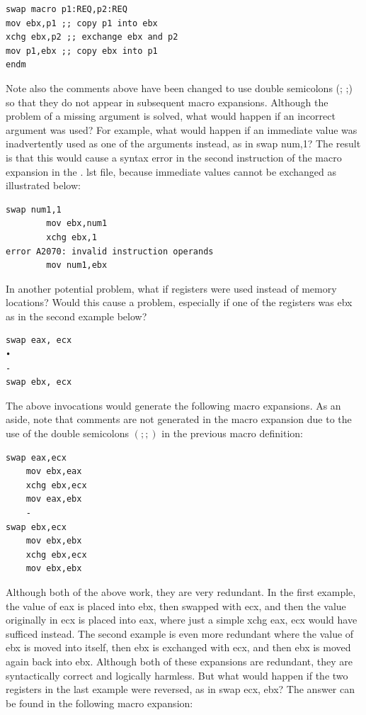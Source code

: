 \documentclass[10pt]{book}
\begin{document}
\begin{verbatim}
swap macro p1:REQ,p2:REQ
mov ebx,p1 ;; copy p1 into ebx
xchg ebx,p2 ;; exchange ebx and p2
mov p1,ebx ;; copy ebx into p1
endm
\end{verbatim}

Note also the comments above have been changed to use double semicolons (; ;) so that they do not appear in subsequent macro expansions. Although the problem of a missing argument is solved, what would happen if an incorrect argument was used? For example, what would happen if an immediate value was inadvertently used as one of the arguments instead, as in swap num,1? The result is that this would cause a syntax error in the second instruction of the macro\\
expansion in the . lst file, because immediate values cannot be exchanged as illustrated below:


\begin{verbatim}
swap num1,1
        mov ebx,num1
        xchg ebx,1
error A2070: invalid instruction operands
        mov num1,ebx
\end{verbatim}

In another potential problem, what if registers were used instead of memory locations? Would this cause a problem, especially if one of the registers was ebx as in the second example below?

\begin{verbatim}
swap eax, ecx
•
-
swap ebx, ecx
\end{verbatim}

The above invocations would generate the following macro expansions. As an aside, note that comments are not generated in the macro expansion due to the use of the double semicolons $(; ;)$ in the previous macro definition:

\begin{verbatim}
swap eax,ecx
    mov ebx,eax
    xchg ebx,ecx
    mov eax,ebx
    -
swap ebx,ecx
    mov ebx,ebx
    xchg ebx,ecx
    mov ebx,ebx
\end{verbatim}

Although both of the above work, they are very redundant. In the first example, the value of eax is placed into ebx, then swapped with ecx, and then the value originally in ecx is placed into eax, where just a simple xchg eax, ecx would have sufficed instead. The second example is even more redundant where the value of ebx is moved into itself, then ebx is exchanged with ecx, and then ebx is moved again back into ebx. Although both of these expansions are redundant, they are syntactically correct and logically harmless. But what would happen if the two registers in the last example were reversed, as in swap ecx, ebx? The answer can be found in the following macro expansion:
\end{document}
